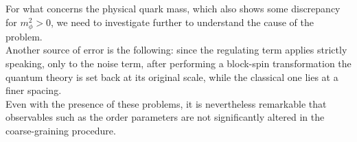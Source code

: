 For what concerns the physical quark mass, which also shows some discrepancy for $m_\phi^2 > 0$, we need to investigate further to understand the cause of the problem. \\
Another source of error is the following: since the regulating term applies strictly speaking, only to the noise term, after performing a block-spin transformation the quantum theory is set back at its original scale, while the classical one lies at a finer spacing. \\
Even with the presence of these problems, it is nevertheless remarkable that observables such as the order parameters are not significantly altered in the coarse-graining procedure.